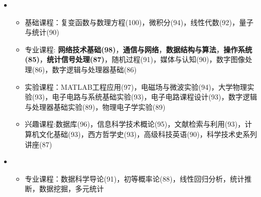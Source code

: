   \begin{itemize}[leftmargin=*]
    \item
      {\small
      \begin{itemize}
        \item{基础课程：复变函数与数理方程(100)，微积分(94)，线性代数(92)，量子与统计(90)}

        \item{专业课程: \textbf{网络技术基础(98)}，\textbf{通信与网络}，\textbf{数据结构与算法}，\textbf{操作系统(85)}，\textbf{统计信号处理(87)}，随机过程(91)，媒体与认知(90)，数字图像处理(86)，数字逻辑与处理器基础(86)}

        \item{实验课程：MATLAB工程应用(97)，电磁场与微波实验(94)，大学物理实验(93)，电子电路与系统基础实验(93)，电子电路课程设计(93)，数字逻辑与处理器基础实验(89)，物理电子学实验(89)}

        \item{兴趣课程:数据库(96)，信息科学技术概论(95)，文献检索与利用(93)，计算机文化基础(93)，西方哲学史(93)，高级科技英语(90)，科学技术史系列讲座(87)}
      \end{itemize}
      }
    \item
      {\small
      \begin{itemize}
        \item{专业课程：数据科学导论(91)，初等概率论(88)，线性回归分析，统计推断，数据挖掘，多元统计}
      \end{itemize}
      }
  \end{itemize}